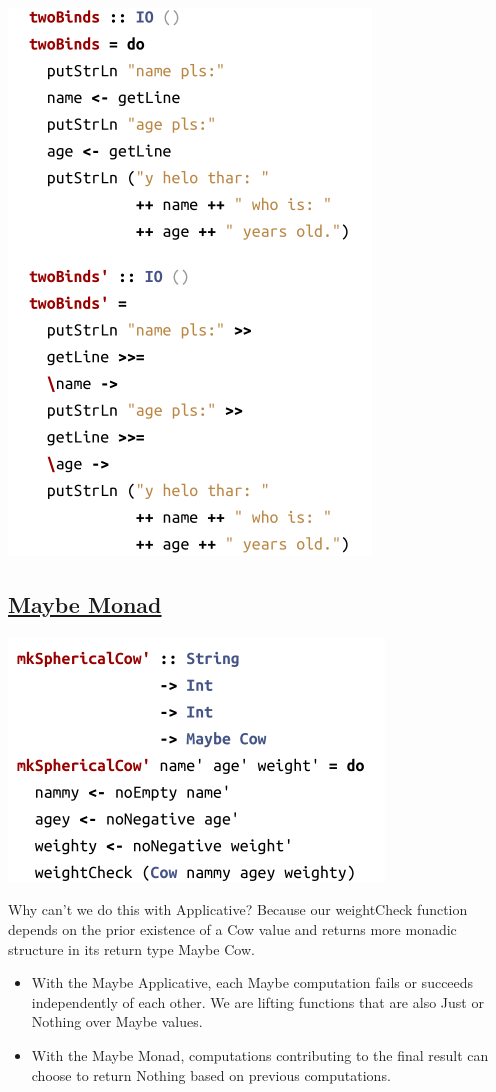 \documentclass{article}
\begin{document}
  \includegraphics[width = 7 cm]{./images/dosyntax.png} 

  \subsection*{{\selectfont \underline{Maybe Monad}}}
    \includegraphics[width = 6 cm]{./images/mkCow.png} 
  
  Why can't we do this with {\selectfont Applicative}? Because our {\selectfont weightCheck} function depends on the prior existence of a {\selectfont Cow} value and returns more monadic structure in its return type {\selectfont Maybe Cow}.
\begin{itemize}
  \renewcommand\labelitemi{{\footnotesize \textcolor{blue5}{$\blacksquare$}} }
  \item With the {\selectfont Maybe Applicative}, each {\selectfont Maybe} computation fails or succeeds independently of each other. We are lifting functions that are also {\selectfont Just} or {\selectfont Nothing} over {\selectfont Maybe} values.
  \item With the {\selectfont Maybe Monad}, computations contributing to the final result can choose to return {\selectfont Nothing} based on previous computations.
\end{itemize}
\end{document}
